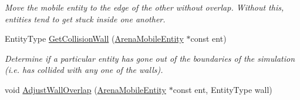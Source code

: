\begin{DoxyCompactItemize}
\begin{DoxyCompactList}\small\item\em Move the mobile entity to the edge of the other without overlap. Without this, entities tend to get stuck inside one another. \end{DoxyCompactList}\item 
Entity\+Type \hyperlink{classArena_a7b72cf7688ee6ab1395bf438663bc1da}{Get\+Collision\+Wall} (\hyperlink{classArenaMobileEntity}{Arena\+Mobile\+Entity} $\ast$const ent)
\begin{DoxyCompactList}\small\item\em Determine if a particular entity has gone out of the boundaries of the simulation (i.\+e. has collided with any one of the walls). \end{DoxyCompactList}\item 
void \hyperlink{classArena_a51c1e99dfd9a618c6041fd22d0a11959}{Adjust\+Wall\+Overlap} (\hyperlink{classArenaMobileEntity}{Arena\+Mobile\+Entity} $\ast$const ent, Entity\+Type wall)\hypertarget{classArena_a51c1e99dfd9a618c6041fd22d0a11959}{}\label{classArena_a51c1e99dfd9a618c6041fd22d0a11959}


\end{DoxyCompactItemize}
